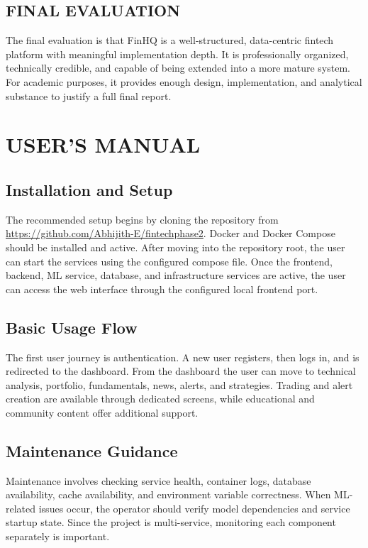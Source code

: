 \documentclass[12pt,a4paper]{report}
\newcommand{\projectshort}{FinHQ}
\newcommand{\repolink}{https://github.com/Abhijith-E/fintechphase2}
\begin{document}
\section{FINAL EVALUATION}
The final evaluation is that \projectshort{} is a well-structured, data-centric fintech platform with meaningful implementation depth. It is professionally organized, technically credible, and capable of being extended into a more mature system. For academic purposes, it provides enough design, implementation, and analytical substance to justify a full final report.

\appendix
\chapter{USER'S MANUAL}
\section{Installation and Setup}
The recommended setup begins by cloning the repository from \url{\repolink}. Docker and Docker Compose should be installed and active. After moving into the repository root, the user can start the services using the configured compose file. Once the frontend, backend, ML service, database, and infrastructure services are active, the user can access the web interface through the configured local frontend port.

\section{Basic Usage Flow}
The first user journey is authentication. A new user registers, then logs in, and is redirected to the dashboard. From the dashboard the user can move to technical analysis, portfolio, fundamentals, news, alerts, and strategies. Trading and alert creation are available through dedicated screens, while educational and community content offer additional support.

\section{Maintenance Guidance}
Maintenance involves checking service health, container logs, database availability, cache availability, and environment variable correctness. When ML-related issues occur, the operator should verify model dependencies and service startup state. Since the project is multi-service, monitoring each component separately is important.
\end{document}

